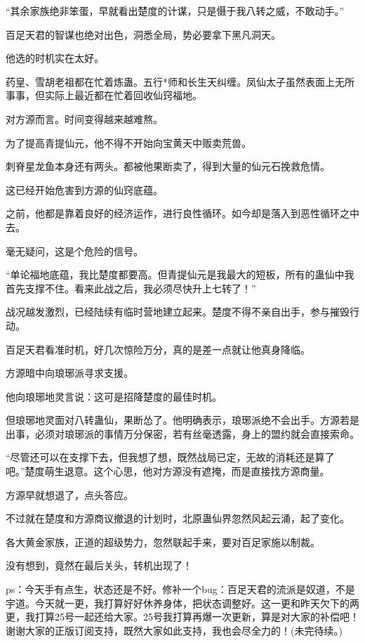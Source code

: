 \begin{this_body}
“其余家族绝非笨蛋，早就看出楚度的计谋，只是慑于我八转之威，不敢动手。”

百足天君的智谋也绝对出色，洞悉全局，势必要拿下黑凡洞天。

他选的时机实在太好。

药皇、雪胡老祖都在忙着炼蛊。五行*师和长生天纠缠。凤仙太子虽然表面上无所事事，但实际上最近都在忙着回收仙窍福地。

对方源而言。时间变得越来越难熬。

为了提高青提仙元，他不得不开始向宝黄天中贩卖荒兽。

刺脊星龙鱼本身还有两头。都被他果断卖了，得到大量的仙元石挽救危情。

这已经开始危害到方源的仙窍底蕴。

之前，他都是靠着良好的经济运作，进行良性循环。如今却是落入到恶性循环之中去。

毫无疑问，这是个危险的信号。

“单论福地底蕴，我比楚度都要高。但青提仙元是我最大的短板，所有的蛊仙中我首先支撑不住。看来此战之后，我必须尽快升上七转了！”

战况越发激烈，已经陆续有临时营地建立起来。楚度不得不亲自出手，参与摧毁行动。

百足天君看准时机，好几次惊险万分，真的是差一点就让他真身降临。

方源暗中向琅琊派寻求支援。

他向琅琊地灵言说：这可是招降楚度的最佳时机。

但琅琊地灵面对八转蛊仙，果断怂了。他明确表示，琅琊派绝不会出手。方源若是出事，必须对琅琊派的事情万分保密，若有丝毫透露，身上的盟约就会直接索命。

“尽管还可以在支撑下去，但我想了想，既然战局已定，无故的消耗还是算了吧。”楚度萌生退意。这个心思，他对方源没有遮掩，而是直接找方源商量。

方源早就想退了，点头答应。

不过就在楚度和方源商议撤退的计划时，北原蛊仙界忽然风起云涌，起了变化。

各大黄金家族，正道的超级势力，忽然联起手来，要对百足家施以制裁。

没有想到，竟然在最后关头，转机出现了！

ps：今天手有点生，状态还是不好。修补一个bug：百足天君的流派是奴道，不是宇道。今天就一更，我打算好好休养身体，把状态调整好。这一更和昨天欠下的两更，我打算25号一起还给大家。25号我打算再爆一次更新，算是对大家的补偿吧！谢谢大家的正版订阅支持，既然大家如此支持，我也会尽全力的！(未完待续。)

\end{this_body}

